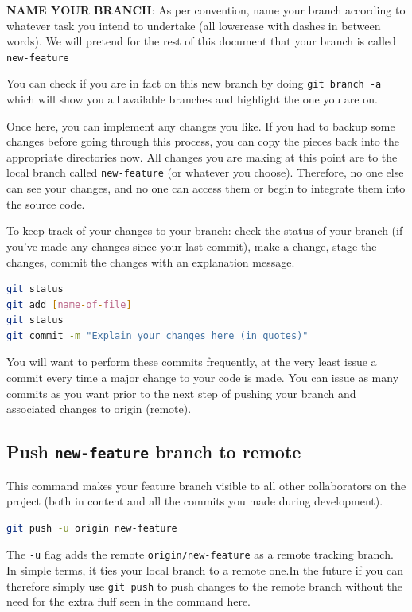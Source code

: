 \documentclass[10pt]{article}
\begin{document}
\textbf{NAME YOUR BRANCH}: As per convention, name your branch according to whatever task you intend to undertake (all lowercase with dashes in between words). We will pretend for the rest of this document that your branch is called \texttt{new-feature}

You can check if you are in fact on this new branch by doing \texttt{git branch -a} which will show you all available branches and highlight the one you are on.

Once here, you can implement any changes you like. If you had to backup some changes before going through this process, you can copy the pieces back into the appropriate directories now. All changes you are making at this point are to the local branch called \texttt{new-feature} (or whatever you choose). Therefore, no one else can see your changes, and no one can access them or begin to integrate them into the source code. 

To keep track of your changes to your branch: check the status of your branch (if you've made any changes since your last commit), make a change, stage the changes, commit the changes with an explanation message. 

\begin{lstlisting}[language=bash]
git status
git add [name-of-file]
git status
git commit -m "Explain your changes here (in quotes)"
\end{lstlisting}

You will want to perform these commits frequently, at the very least issue a commit every time a major change to your code is made. You can issue as many commits as you want prior to the next step of pushing your branch and associated changes to origin (remote). 

\subsection{Push \texttt{new-feature} branch to remote}
This command makes your feature branch visible to all other collaborators on the project (both in content and all the commits you made during development).

\begin{lstlisting}[language=bash]
git push -u origin new-feature
\end{lstlisting}

 The \texttt{-u} flag adds the remote \texttt{origin/new-feature} as a remote tracking branch. In simple terms, it ties your local branch to a remote one.In the future if you can therefore simply use \texttt{git push} to push changes to the remote branch without the need for the extra fluff seen in the command here.
\end{document}
